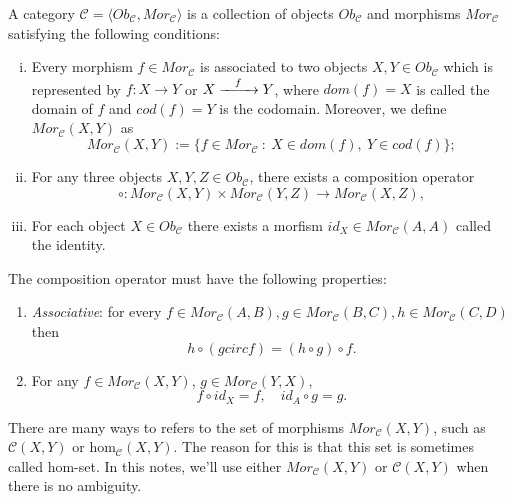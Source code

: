 \begin{definition}[Category]
	A category $\mathcal C = \langle Ob_{\mathcal C}, Mor_{\mathcal C} \rangle$ is
	a collection of objects $Ob_\mathcal C$ and morphisms
	$Mor_\mathcal C$ satisfying the following conditions:
  \begin{enumerate}[(i)]
    \item Every morphism $f \in Mor_\mathcal C$ is associated to two objects $X,Y \in Ob_{\mathcal C}$
      which is represented by $f:X \to Y$ or $X \xrightarrow{\hspace{3mm}f \hspace{3mm}} Y$,
      where $dom(f) = X$ is called the domain of $f$ and $cod(f)=Y$ is the codomain. Moreover, we define
      $Mor_\mathcal C (X,Y)$ as 
      \begin{displaymath}
        Mor_\mathcal C (X,Y) := \{f \in Mor_\mathcal C \ : \ X \in dom(f), \ Y \in cod(f)\};
      \end{displaymath}
    \item For any three objects $X,Y, Z \in Ob_\mathcal C$, there exists a composition operator
      \begin{displaymath}
        \circ: Mor_\mathcal C (X,Y)   \times Mor_\mathcal C (Y,Z) \to Mor_\mathcal C (X,Z),
      \end{displaymath}
      \item For each object $X \in Ob_\mathcal C$ there exists a morfism $id_X \in Mor_\mathcal C (A,A)$
        called the identity.
  \end{enumerate}
  The composition operator must have the following properties:
  \begin{enumerate}[(p.1)]
    \item \textit{Associative}: for every $f \in Mor_\mathcal C (A,B),
      g \in Mor_\mathcal C (B,C), h \in Mor_\mathcal C (C,D)$ then
      \begin{displaymath}
        h \circ (g circ f) = (h \circ g) \circ f.
      \end{displaymath}
    \item For any $f \in Mor_\mathcal C (X,Y)$, $g \in Mor_\mathcal C (Y,X)$, 
      \begin{displaymath}
        f \circ id_X = f,  \quad id_A \circ g = g.
      \end{displaymath}
  \end{enumerate}
\end{definition}

There are many ways to refers to the set of morphisms $Mor_\mathcal C (X,Y)$, such as
$\mathcal C(X,Y)$ or $\text{hom}_\mathcal C (X,Y)$. The reason for this is that
this set is sometimes called hom-set. In this notes, we'll use either $Mor_\mathcal C (X,Y)$
or $\mathcal C (X,Y)$ when there is no ambiguity.


